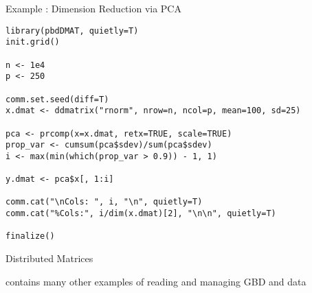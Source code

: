 \begin{frame}[fragile]
\fontsize{8pt}{7.2}\selectfont
  \begin{exampleblock}{Example \countex:  Dimension Reduction via PCA}
\begin{lstlisting}
library(pbdDMAT, quietly=T)
init.grid()

n <- 1e4
p <- 250

comm.set.seed(diff=T)
x.dmat <- ddmatrix("rnorm", nrow=n, ncol=p, mean=100, sd=25)

pca <- prcomp(x=x.dmat, retx=TRUE, scale=TRUE)
prop_var <- cumsum(pca$sdev)/sum(pca$sdev)
i <- max(min(which(prop_var > 0.9)) - 1, 1)

y.dmat <- pca$x[, 1:i]

comm.cat("\nCols: ", i, "\n", quietly=T)
comm.cat("%Cols:", i/dim(x.dmat)[2], "\n\n", quietly=T)

finalize()
\end{lstlisting} %
  \end{exampleblock}
\end{frame}



\begin{frame}
  \begin{block}{Distributed Matrices}\pause
  \begin{center}
     contains many other examples of reading and managing GBD and  data
  \end{center}
  \end{block}
\end{frame}


